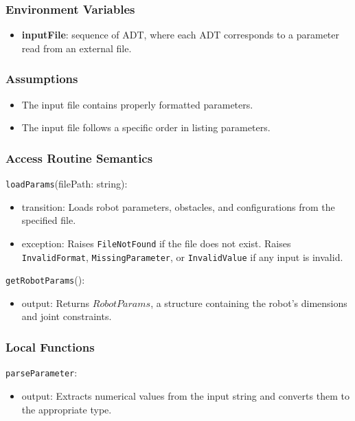 \documentclass[12pt, titlepage]{article}
\begin{document}
\subsubsection{Environment Variables}

\begin{itemize}
    \item \textbf{inputFile}: sequence of ADT, where each ADT corresponds to a parameter read from an external file.
\end{itemize}

\subsubsection{Assumptions}

\begin{itemize}
    \item The input file contains properly formatted parameters.
    \item The input file follows a specific order in listing parameters.
\end{itemize}

\subsubsection{Access Routine Semantics}

\noindent \texttt{loadParams}(filePath: string):
\begin{itemize}
  \item transition: Loads robot parameters, obstacles, and configurations from the specified file.
  \item exception: Raises \texttt{FileNotFound} if the file does not exist. Raises \texttt{InvalidFormat}, \texttt{MissingParameter}, or \texttt{InvalidValue} if any input is invalid.
\end{itemize}

\noindent \texttt{getRobotParams}():
\begin{itemize}
  \item output: Returns \( RobotParams \), a structure containing the robot's dimensions and joint constraints.
\end{itemize}

\subsubsection{Local Functions}

\noindent \texttt{parseParameter}:
\begin{itemize}
  \item output: Extracts numerical values from the input string and converts them to the appropriate type.
\end{itemize}
\end{document}
